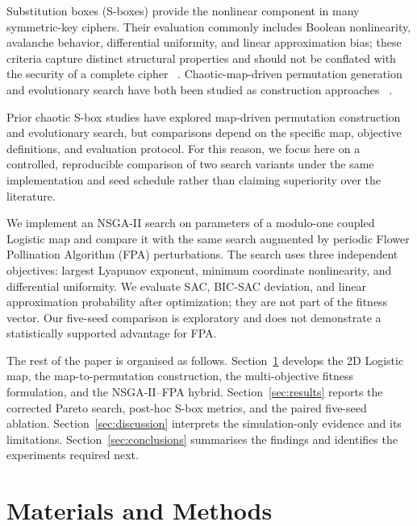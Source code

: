 \documentclass[11pt,a4paper]{article}
\begin{document}
Substitution boxes (S-boxes) provide the nonlinear component in many
symmetric-key ciphers. Their evaluation commonly includes Boolean
nonlinearity, avalanche behavior, differential uniformity, and linear
approximation bias; these criteria capture distinct structural
properties and should not be conflated with the security of a complete
cipher~\cite{adams2010goodsboxes, carlet2020indicator}
\cite{matsui1993linear, biham1991differential}. Chaotic-map-driven
permutation generation and evolutionary search have both been studied
as construction approaches~\cite{cassalquiroga2019generationofdynami, kuznetsov2024evolutionaryapproa}
\cite{mclaughlin2013usingevolutionaryc}.

Prior chaotic S-box studies have explored map-driven permutation
construction and evolutionary search, but comparisons depend on the
specific map, objective definitions, and evaluation protocol. For this
reason, we focus here on a controlled, reproducible comparison of two
search variants under the same implementation and seed schedule rather
than claiming superiority over the literature.

We implement an NSGA-II search on parameters of a modulo-one
coupled Logistic map and compare it with the same search augmented by
periodic Flower Pollination Algorithm (FPA) perturbations. The search
uses three independent objectives: largest Lyapunov exponent, minimum
coordinate nonlinearity, and differential uniformity. We evaluate SAC,
BIC-SAC deviation, and linear approximation probability after
optimization; they are not part of the fitness vector. Our five-seed
comparison is exploratory and does not demonstrate a statistically
supported advantage for FPA.

The rest of the paper is organised as follows.
Section~\ref{sec:methods} develops the 2D Logistic map, the
map-to-permutation construction, the multi-objective fitness
formulation, and the NSGA-II--FPA hybrid.
Section~\ref{sec:results} reports the corrected Pareto search,
post-hoc S-box metrics, and the paired five-seed ablation.
Section~\ref{sec:discussion} interprets the simulation-only evidence
and its limitations. Section~\ref{sec:conclusions} summarises the
findings and identifies the experiments required next.

\section{Materials and Methods}
\label{sec:methods}
\end{document}
